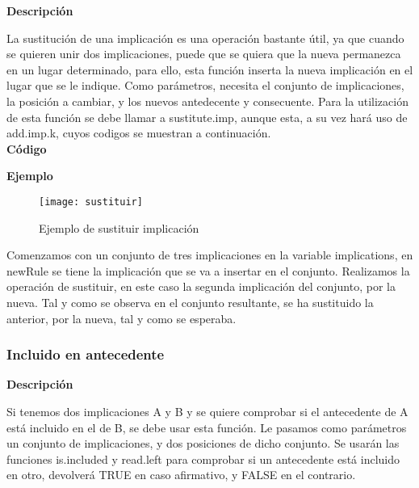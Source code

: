     \textbf{Descripci\'on}

    La sustituci\'on de una implicaci\'on es una operaci\'on bastante \'util, ya que cuando se quieren unir dos implicaciones, puede que 
    se quiera que la nueva permanezca en un lugar determinado, para ello, esta funci\'on inserta la nueva implicaci\'on en el lugar que 
    se le indique. Como par\'ametros, necesita el conjunto de implicaciones, la posici\'on a cambiar, y los nuevos antedecente y consecuente.
    Para la utilizaci\'on de esta funci\'on se debe llamar a sustitute.imp, aunque esta, a su vez har\'a uso de add.imp.k, cuyos codigos se 
    muestran a continuaci\'on. 
    \\


    \textbf{C\'odigo}

    

    
    \bigskip

    \textbf{Ejemplo}

    \begin{figure}[H]
        \centering
        \texttt{[image: sustituir]}
        \caption{Ejemplo de sustituir implicaci\'on}
        \label{fig:sustituir}
    \end{figure}

    Comenzamos con un conjunto de tres implicaciones en la variable implications, en newRule se tiene la implicaci\'on que se va 
    a insertar en el conjunto. Realizamos la operaci\'on de sustituir, en este caso la segunda implicaci\'on del conjunto, por la nueva. 
    Tal y como se observa en el conjunto resultante, se ha sustituido la anterior, por la nueva, tal y como se esperaba.


\subsubsection{Incluido en antecedente}

    \textbf{Descripci\'on}

    Si tenemos dos implicaciones A y B y se quiere comprobar si el antecedente de A est\'a incluido en el de B, se debe usar 
    esta funci\'on. Le pasamos como par\'ametros un conjunto de implicaciones, y dos posiciones de dicho conjunto. Se usar\'an 
    las funciones is.included y read.left para comprobar si un antecedente est\'a incluido en otro, devolver\'a TRUE en caso 
    afirmativo, y FALSE en el contrario.
    \\


